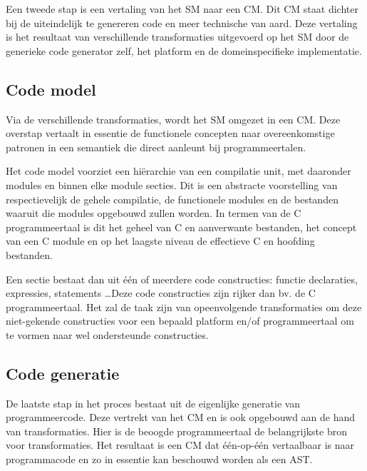 Een tweede stap is een vertaling van het SM naar een CM. Dit CM staat dichter
bij de uiteindelijk te genereren code en meer technische van aard. Deze
vertaling is het resultaat van verschillende transformaties uitgevoerd op het
SM door de generieke code generator zelf, het platform en de domeinspecifieke
implementatie.

\subsection{Code model}
\label{subsection:arch-code-model}

Via de verschillende transformaties, wordt het SM omgezet in een CM. Deze
overstap vertaalt in essentie de functionele concepten naar overeenkomstige
patronen in een semantiek die direct aanleunt bij programmeertalen.

Het code model voorziet een hi\"erarchie van een compilatie unit, met daaronder
modules en binnen elke module secties. Dit is een abstracte voorstelling van
respectievelijk de gehele compilatie, de functionele modules en de bestanden
waaruit die modules opgebouwd zullen worden. In termen van de C programmeertaal
is dit het geheel van C en aanverwante bestanden, het concept van een C module
en op het laagste niveau de effectieve C en hoofding bestanden.

Een sectie bestaat dan uit \'e\'en of meerdere code constructies: functie
declaraties, expressies, statements \dots Deze code constructies zijn rijker
dan bv. de C programmeertaal. Het zal de taak zijn van opeenvolgende
transformaties om deze niet-gekende constructies voor een bepaald platform
en/of programmeertaal om te vormen naar wel ondersteunde constructies.

\subsection{Code generatie}

De laatste stap in het proces bestaat uit de eigenlijke generatie van
programmeercode. Deze vertrekt van het CM en is ook opgebouwd aan de hand van
transformaties. Hier is de beoogde programmeertaal de belangrijkste bron voor
transformaties. Het resultaat is een CM dat \'e\'en-op-\'e\'en vertaalbaar is
naar programmacode en zo in essentie kan beschouwd worden als een AST.
